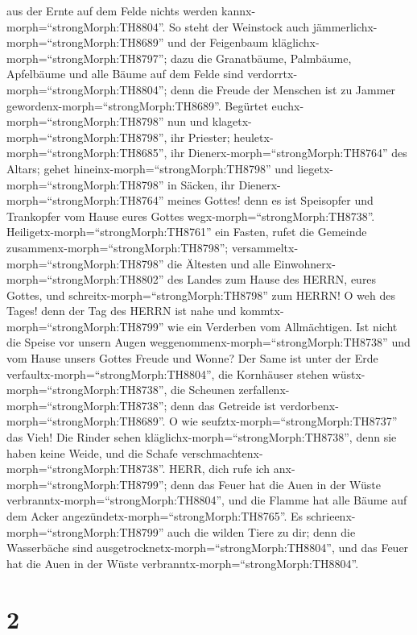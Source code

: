 aus der Ernte auf dem Felde nichts werden
kannx-morph=``strongMorph:TH8804''.  So steht der Weinstock
auch jämmerlichx-morph=``strongMorph:TH8689'' und der Feigenbaum
kläglichx-morph=``strongMorph:TH8797''; dazu die Granatbäume, Palmbäume,
Apfelbäume und alle Bäume auf dem Felde sind
verdorrtx-morph=``strongMorph:TH8804''; denn die Freude der Menschen ist
zu Jammer gewordenx-morph=``strongMorph:TH8689''.  Begürtet
euchx-morph=``strongMorph:TH8798'' nun und
klagetx-morph=``strongMorph:TH8798'', ihr Priester;
heuletx-morph=``strongMorph:TH8685'', ihr
Dienerx-morph=``strongMorph:TH8764'' des Altars; gehet
hineinx-morph=``strongMorph:TH8798'' und
liegetx-morph=``strongMorph:TH8798'' in Säcken, ihr
Dienerx-morph=``strongMorph:TH8764'' meines Gottes! denn es ist
Speisopfer und Trankopfer vom Hause eures Gottes
wegx-morph=``strongMorph:TH8738''. 
Heiligetx-morph=``strongMorph:TH8761'' ein Fasten, rufet die Gemeinde
zusammenx-morph=``strongMorph:TH8798'';
versammeltx-morph=``strongMorph:TH8798'' die Ältesten und alle
Einwohnerx-morph=``strongMorph:TH8802'' des Landes zum Hause des HERRN,
eures Gottes, und schreitx-morph=``strongMorph:TH8798'' zum HERRN!
 O weh des Tages! denn der Tag des HERRN ist nahe und
kommtx-morph=``strongMorph:TH8799'' wie ein Verderben vom Allmächtigen.
 Ist nicht die Speise vor unsern Augen
weggenommenx-morph=``strongMorph:TH8738'' und vom Hause unsers Gottes
Freude und Wonne?  Der Same ist unter der Erde
verfaultx-morph=``strongMorph:TH8804'', die Kornhäuser stehen
wüstx-morph=``strongMorph:TH8738'', die Scheunen
zerfallenx-morph=``strongMorph:TH8738''; denn das Getreide ist
verdorbenx-morph=``strongMorph:TH8689''.  O wie
seufztx-morph=``strongMorph:TH8737'' das Vieh! Die Rinder sehen
kläglichx-morph=``strongMorph:TH8738'', denn sie haben keine Weide, und
die Schafe verschmachtenx-morph=``strongMorph:TH8738''. 
HERR, dich rufe ich anx-morph=``strongMorph:TH8799''; denn das Feuer hat
die Auen in der Wüste verbranntx-morph=``strongMorph:TH8804'', und die
Flamme hat alle Bäume auf dem Acker
angezündetx-morph=``strongMorph:TH8765''.  Es
schrieenx-morph=``strongMorph:TH8799'' auch die wilden Tiere zu dir;
denn die Wasserbäche sind ausgetrocknetx-morph=``strongMorph:TH8804'',
und das Feuer hat die Auen in der Wüste
verbranntx-morph=``strongMorph:TH8804''.

\hypertarget{section-1}{%
\section{2}\label{section-1}}

